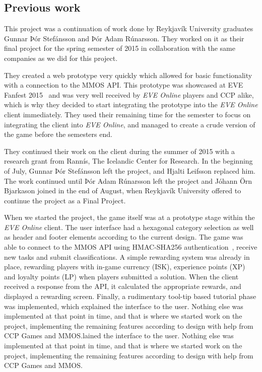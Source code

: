 \subsection{Previous work}
This project was a continuation of work done by Reykjavík University graduates Gunnar Þór Stefánsson and Þór Adam Rúnarsson. They worked on it as their final project for the spring semester of 2015 in collaboration with the same companies as we did for this project.

They created a web prototype very quickly which allowed for basic functionality with a connection to the MMOS API. This prototype was showcased at EVE Fanfest 2015~\cite{fanfest} and was very well received by \emph{EVE Online} players and CCP alike, which is why they decided to start integrating the prototype into the \emph{EVE Online} client immediately. They used their remaining time for the semester to focus on integrating the client into \emph{EVE Online}, and managed to create a crude version of the game before the semesters end.

They continued their work on the client during the summer of 2015 with a research grant from Rannís, The Icelandic Center for Research. In the beginning of July, Gunnar Þór Stefánsson left the project, and Hjalti Leifsson replaced him. The work continued until Þór Adam Rúnarsson left the project and Jóhann Örn Bjarkason joined in the end of August, when Reykjavík University offered to continue the project as a Final Project.

When we started the project, the game itself was at a prototype stage within the \emph{EVE Online} client. The user interface had a hexagonal category selection as well as header and footer elements according to the current design. The game was able to connect to the MMOS API using HMAC-SHA256 authentication~\cite{hmac}, receive new tasks and submit classifications. A simple rewarding system was already in place, rewarding players with in-game currency (ISK), experience points (XP) and loyalty points (LP) when players submitted a solution. When the client received a response from the API, it calculated the appropriate rewards, and displayed a rewarding screen. Finally, a rudimentary tool-tip based tutorial phase was implemented, which explained the interface to the user. Nothing else was implemented at that point in time, and that is where we started work on the project, implementing the remaining features according to design with help from CCP Games and MMOS.lained the interface to the user. Nothing else was implemented at that point in time, and that is where we started work on the project, implementing the remaining features according to design with help from CCP Games and MMOS.
